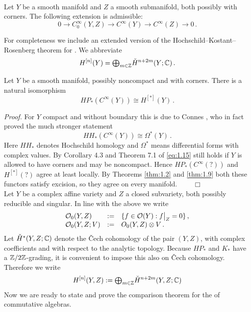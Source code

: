 \begin{thm}\label{thm:1.9} \textup{\cite[Th\'eor\`eme IX.4.3]{Tou}}\\
Let $Y$ be a smooth manifold and $Z$ a smooth submanifold, both
possibly with corners. The following extension is admissible:
\[
0 \to C_0^\infty (Y,Z) \to C^\infty (Y) \to C^\infty (Z) \to 0 \,.
\]
\end{thm}

For completeness we include an extended version of the Hochschild--Kostant--Rosenberg
theorem for \pch \!. We abbreviate
\[
H^{[n]}(Y) = {\textstyle \bigoplus_{m \in \mathbb Z}} \check H^{n+2m}(Y ; \mathbb C) \,.
\]
\begin{thm}\label{thm:1.8}
Let $Y$ be a smooth manifold, possibly noncompact and with corners.
There is a natural isomorphism 
\[
HP_* (C^\infty (Y)) \cong H^{[*]}(Y ) \,.
\]
\end{thm}
\emph{Proof.} 
For $Y$ compact and without boundary this is due to Connes \cite[p. 130]{Con}, who in fact
proved the much stronger statement
\begin{equation}\label{eq:1.15}
HH_* (C^\infty (Y)) \cong \Omega^* (Y) \,.
\end{equation}
Here $HH_*$ denotes Hochschild homology and $\Omega^*$ means differential forms with 
complex values. By Corollary 4.3 and Theorem 7.1 of \cite{BLT} \eqref{eq:1.15} still holds if
$Y$ is allowed to have corners and may be noncompact. Hence $HP_* (C^\infty (?))$ and 
$H^{[*]} (? )$ agree at least locally. By Theorems \ref{thm:1.2} and \ref{thm:1.9} both
these functors satisfy excision, so they agree on every manifold. $\qquad \Box$
\\[2mm]

Let $Y$ be a complex affine variety and $Z$ a closed subvariety,
both possibly reducible and singular. In line with the above we write
\[
\begin{array}{lll}
\mathcal O_0 (Y,Z) & := & \{ f \in \mathcal O (Y) : f \big|_Z = 0 \} \,, \\
\mathcal O_0 (Y,Z;V) & := & O_0 (Y,Z) \otimes V \,.
\end{array}
\]
Let $\check H^* (Y,Z;\mathbb C )$ denote the \v Cech cohomology of the pair
$(Y,Z)$, with complex coefficients and with respect to the analytic
topology. Because $HP_*$ and $K_*$ have a $\mathbb Z / 2 \mathbb Z$-grading,
it is convenient to impose this also on \v Cech cohomology. Therefore we write
\begin{equation}\label{eq:1.6}
H^{[n]} (Y,Z) := {\textstyle \bigoplus_{m \in \mathbb Z}} \check H^{n+2m} (Y,Z;\mathbb C )
\end{equation}
Now we are ready to state and prove the comparison theorem
for the \pch of commutative algebras.

